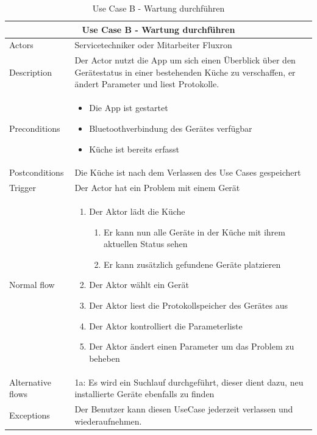 \begin{table}[H]
\begin{tabular}{|p{3cm}|p{10cm}|}
  \hline
  \multicolumn{2}{|c|}{Use Case B - Wartung durchführen}
  \\\hline
  	Actors
  &
  	Servicetechniker oder Mitarbeiter Fluxron
  \\\hline
  	Description 
  &
  	Der Actor nutzt die App um sich einen Überblick über den Gerätestatus in einer bestehenden Küche zu verschaffen, er ändert Parameter und liest Protokolle.
  \\\hline
  	Preconditions 
  & 
  	\begin{itemize}
	  \item Die App ist gestartet
	  \item Bluetoothverbindung des Gerätes verfügbar
	  \item Küche ist bereits erfasst
  	\end{itemize}
  \\\hline
  	Postconditions
  &
    Die Küche ist nach dem Verlassen des Use Cases gespeichert
  \\\hline
  	Trigger
  &
    Der Actor hat ein Problem mit einem Gerät
  \\\hline
  	Normal flow
  &
	\begin{enumerate}
	  \item Der Aktor lädt die Küche
      \begin{enumerate}
    	\item Er kann nun alle Geräte in der Küche mit ihrem aktuellen Status sehen
	    \item Er kann zusätzlich gefundene Geräte platzieren
	  \end{enumerate}
	  \item Der Aktor wählt ein Gerät
      \item Der Aktor liest die Protokollspeicher des Gerätes aus
      \item Der Aktor kontrolliert die Parameterliste
      \item Der Aktor ändert einen Parameter um das Problem zu beheben
	\end{enumerate}
  \\\hline
    Alternative flows
  &
  1a: Es wird ein Suchlauf durchgeführt, dieser dient dazu, neu installierte Geräte ebenfalls zu finden
  \\\hline
    Exceptions
  &
    Der Benutzer kann diesen UseCase jederzeit verlassen und wiederaufnehmen.
  \\\hline
\end{tabular}
\caption{Use Case B - Wartung durchführen}
\end{table}

